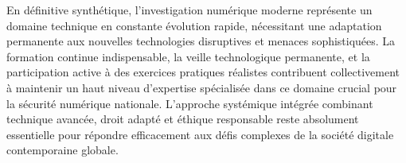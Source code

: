 \documentclass[12pt, a4paper]{article}
\begin{document}
	En définitive synthétique, l'investigation numérique moderne représente un domaine technique en constante évolution rapide, nécessitant une adaptation permanente aux nouvelles technologies disruptives et menaces sophistiquées. La formation continue indispensable, la veille technologique permanente, et la participation active à des exercices pratiques réalistes contribuent collectivement à maintenir un haut niveau d'expertise spécialisée dans ce domaine crucial pour la sécurité numérique nationale. L'approche systémique intégrée combinant technique avancée, droit adapté et éthique responsable reste absolument essentielle pour répondre efficacement aux défis complexes de la société digitale contemporaine globale.
	
\end{document}
